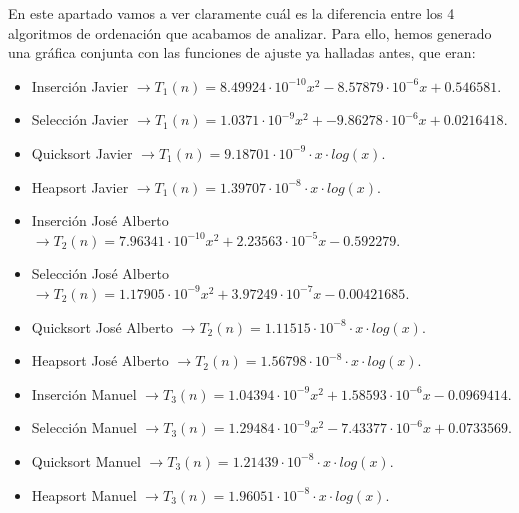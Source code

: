 \documentclass[10pt,a4paper]{article}
\begin{document}
En este apartado vamos a ver claramente cuál es la diferencia entre los 4 algoritmos de ordenación que acabamos de analizar. Para ello, hemos generado una gráfica conjunta con las funciones de ajuste ya halladas antes, que eran:

\begin{itemize}
	\item Inserción Javier \(\rightarrow T_1(n) = 8.49924 \cdot 10^{-10} x^2 - 8.57879 \cdot 10^{-6} x + 0.546581\).
	\item Selección Javier \(\rightarrow T_1(n) = 1.0371 \cdot 10^{-9} x^2 + -9.86278 \cdot 10^{-6} x +0.0216418\).
	\item Quicksort Javier \(\rightarrow T_1(n) = 9.18701 \cdot 10^{-9} \cdot x \cdot log(x)\).
	\item Heapsort Javier \(\rightarrow T_1(n) = 1.39707 \cdot 10^{-8} \cdot x \cdot log(x)\).
\end{itemize}

\begin{itemize}
	\item Inserción José Alberto \(\rightarrow T_2(n) = 7.96341 \cdot 10^{-10} x^2 + 2.23563 \cdot 10^{-5} x - 0.592279\).
	\item Selección José Alberto \(\rightarrow T_2(n) = 1.17905 \cdot 10^{-9} x^2 + 3.97249 \cdot 10^{-7} x - 0.00421685\).
	\item Quicksort José Alberto \(\rightarrow T_2(n) = 1.11515 \cdot 10^{-8} \cdot x \cdot log(x)\).
	\item Heapsort José Alberto \(\rightarrow T_2(n) = 1.56798 \cdot 10^{-8} \cdot x \cdot log(x)\).
\end{itemize}

\begin{itemize}
	\item Inserción Manuel \(\rightarrow T_3(n) = 1.04394 \cdot 10^{-9} x^2 + 1.58593 \cdot 10^{-6} x - 0.0969414\).
	\item Selección Manuel \(\rightarrow T_3(n) = 1.29484 \cdot 10^{-9} x^2 - 7.43377 \cdot 10^{-6} x + 0.0733569\).
	\item Quicksort Manuel \(\rightarrow T_3(n) = 1.21439 \cdot 10^{-8} \cdot x \cdot log(x)\).
	\item Heapsort Manuel \(\rightarrow T_3(n) = 1.96051 \cdot 10^{-8} \cdot x \cdot log(x)\).
\end{itemize}

\newpage
\end{document}
